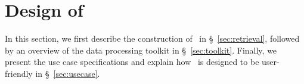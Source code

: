 \section{Design of \chatiot}\label{sec:design}
In this section, we first describe the construction of \iotrgen\ in \S~\ref{sec:retrieval}, followed by an overview of the data processing toolkit in \S~\ref{sec:toolkit}.
Finally, we present the use case specifications and explain how \chatiot\ is designed to be user-friendly in \S~\ref{sec:usecase}.








